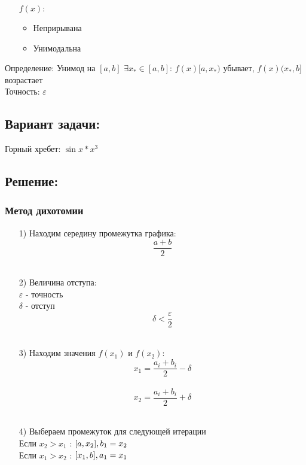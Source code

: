 \documentclass[fleqn]{article}
\begin{document}
\begin{itemize}
    \item [$f(x):$]
    \begin{itemize}
        \item Неприрывана
        \item Унимодальна
    \end{itemize}
\end{itemize}

Определение: Унимод на $[a, b]$  $ \exists x_* \in [a, b]$:  $f(x) [a,x_*)$ убывает, $f(x) (x_*, b]$  возрастает\\

Точность: $\varepsilon$

\subsection{Вариант задачи:}
Горный хребет: $\sin{x}*x^3$

\subsection{Решение:}
\subsubsection{Метод дихотомии}

\begin{itemize}
    \item[1)] Находим середину промежутка графика:\\
    $$\frac{a+b}{2}$$\\
    
    \item[2)] Величина отступа:\\
    $\varepsilon$ - точность\\
    $\delta$ - отступ\\
    $$\delta < \frac{\varepsilon}{2} $$\\
    
    \item[3)] Находим значения $f(x_1)$ и $f(x_2)$:\\
    $$x_1 = \frac{a_i+b_i}{2} - \delta$$\\
    $$x_2 = \frac{a_i+b_i}{2}+\delta$$\\
    
    \item[4)] Выбераем промежуток для следующей итерации\\
    Если $x_2>x_1$ : $[a, x_2],\space b_1=x_2$\\
    Если $x_1>x_2$ : $[x_1, b],\space a_1=x_1$\\
\end{itemize}
\end{document}
